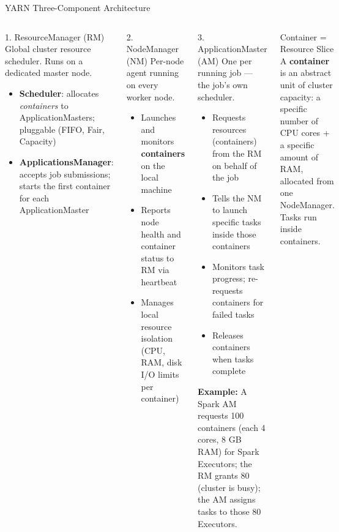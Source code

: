 \documentclass[aspectratio=169,10pt]{beamer}
\begin{document}
\begin{frame}{YARN Three-Component Architecture}
  \begin{columns}[T]
      \begin{block}{1. ResourceManager (RM)}
        Global cluster resource scheduler.  Runs on a dedicated master node.
        \begin{itemize}
          \item \textbf{Scheduler}: allocates \emph{containers} to ApplicationMasters; pluggable (FIFO, Fair, Capacity)
          \item \textbf{ApplicationsManager}: accepts job submissions; starts the first container for each ApplicationMaster
        \end{itemize}
      \end{block}
      \vspace{4pt}
      \begin{block}{2. NodeManager (NM)}
        Per-node agent running on every worker node.
        \begin{itemize}
          \item Launches and monitors \textbf{containers} on the local machine
          \item Reports node health and container status to RM via heartbeat
          \item Manages local resource isolation (CPU, RAM, disk I/O limits per container)
        \end{itemize}
      \end{block}

      \begin{exampleblock}{3. ApplicationMaster (AM)}
        One per running job — the job's own scheduler.
        \begin{itemize}
          \item Requests resources (containers) from the RM on behalf of the job
          \item Tells the NM to launch specific tasks inside those containers
          \item Monitors task progress; re-requests containers for failed tasks
          \item Releases containers when tasks complete
        \end{itemize}
        \vspace{4pt}
        \textbf{Example:} A Spark AM requests 100 containers (each 4 cores, 8 GB RAM) for Spark Executors; the RM grants 80 (cluster is busy); the AM assigns tasks to those 80 Executors.
      \end{exampleblock}
      \vspace{4pt}
      \begin{alertblock}{Container = Resource Slice}
        A \textbf{container} is an abstract unit of cluster capacity: a specific number of CPU cores + a specific amount of RAM, allocated from one NodeManager.  Tasks run inside containers.
      \end{alertblock}
  \end{columns}
\end{frame}
\end{document}
